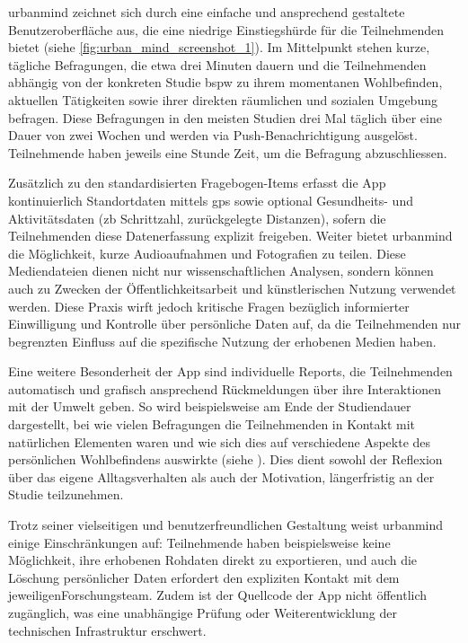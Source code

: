 \gls{urbanmind} zeichnet sich durch eine einfache und ansprechend gestaltete Benutzeroberfläche aus, die eine niedrige Einstiegshürde für die Teilnehmenden bietet (siehe \cref{fig:urban_mind_screenshot_1}). Im Mittelpunkt stehen kurze, tägliche Befragungen, die etwa drei Minuten dauern und die Teilnehmenden abhängig von der konkreten Studie \acrshort{bspw} zu ihrem momentanen Wohlbefinden, aktuellen Tätigkeiten sowie ihrer direkten räumlichen und sozialen Umgebung befragen. Diese Befragungen in den meisten Studien drei Mal täglich über eine Dauer von zwei Wochen und werden via Push-Benachrichtigung ausgelöst. Teilnehmende haben jeweils eine Stunde Zeit, um die Befragung abzuschliessen.

Zusätzlich zu den standardisierten Fragebogen-Items erfasst die App kontinuierlich Standortdaten mittels \acrshort{gps} sowie optional Gesundheits- und Aktivitätsdaten (\acrshort{zb} Schrittzahl, zurückgelegte Distanzen), sofern die Teilnehmenden diese Datenerfassung explizit freigeben. Weiter bietet \gls{urbanmind} die Möglichkeit, kurze Audioaufnahmen und Fotografien zu teilen. Diese Mediendateien dienen nicht nur wissenschaftlichen Analysen, sondern können auch zu Zwecken der Öffentlichkeitsarbeit und künstlerischen Nutzung verwendet werden. Diese Praxis wirft jedoch kritische Fragen bezüglich informierter Einwilligung und Kontrolle über persönliche Daten auf, da die Teilnehmenden nur begrenzten Einfluss auf die spezifische Nutzung der erhobenen Medien haben.

Eine weitere Besonderheit der App sind individuelle Reports, die Teilnehmenden automatisch und grafisch ansprechend Rückmeldungen über ihre Interaktionen mit der Umwelt geben. So wird beispielsweise am Ende der Studiendauer dargestellt, bei wie vielen Befragungen die Teilnehmenden in Kontakt mit natürlichen Elementen waren und wie sich dies auf verschiedene Aspekte des persönlichen Wohlbefindens auswirkte (siehe ). Dies dient sowohl der Reflexion über das eigene Alltagsverhalten als auch der Motivation, längerfristig an der Studie teilzunehmen.

Trotz seiner vielseitigen und benutzerfreundlichen Gestaltung weist \gls{urbanmind} einige Einschränkungen auf: Teilnehmende haben beispielsweise keine Möglichkeit, ihre erhobenen Rohdaten direkt zu exportieren, und auch die Löschung persönlicher Daten erfordert den expliziten Kontakt mit dem jeweiligenForschungsteam. Zudem ist der Quellcode der App nicht öffentlich zugänglich, was eine unabhängige Prüfung oder Weiterentwicklung der technischen Infrastruktur erschwert.

